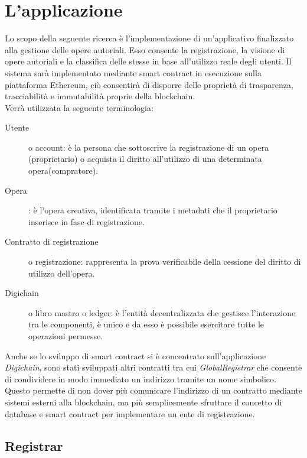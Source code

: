 

\section{L'applicazione}\label{ssec:Progettazione}
	Lo scopo della seguente ricerca è l'implementazione di un'applicativo finalizzato alla gestione delle opere autoriali. Esso consente la registrazione, la visione di opere autoriali e la classifica delle stesse in base all'utilizzo reale degli utenti. Il sistema sarà implementato mediante smart contract in esecuzione sulla piattaforma Ethereum, ciò consentirà di disporre delle proprietà di trasparenza, tracciabilità e immutabilità proprie della blockchain.\\
	
	Verrà utilizzata la seguente terminologia:
	\begin{description}
		\item[Utente] o account: è la persona che sottoscrive la registrazione di un opera (proprietario) o acquista il diritto all'utilizzo di una determinata opera(compratore).
		\item[Opera]: è l'opera creativa, identificata tramite i metadati che il proprietario inserisce in fase di registrazione.
		\item[Contratto di registrazione] o registrazione: rappresenta la prova verificabile della cessione del diritto di utilizzo dell'opera.
		\item[Digichain] o libro mastro o ledger: è l'entità decentralizzata che gestisce l'interazione tra le componenti, è unico e da esso è possibile esercitare tutte le operazioni permesse.
	\end{description}
	
	Anche se lo sviluppo di smart contract si è concentrato sull'applicazione \textit{Digichain}, sono stati sviluppati altri contratti tra cui \textit{GlobalRegistrar} che consente di condividere in modo immediato un indirizzo tramite un nome simbolico. Questo permette di non dover più comunicare l'indirizzo di un contratto mediante sistemi esterni alla blockchain, ma più semplicemente sfruttare il concetto di database e smart contract per implementare un ente di registrazione. 
	
	\subsection{Registrar}
	
